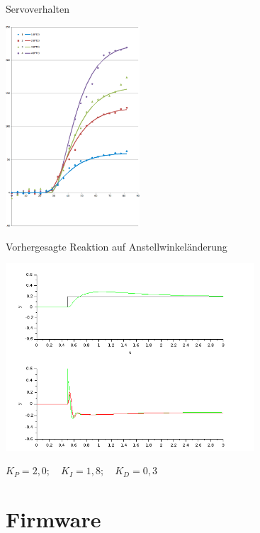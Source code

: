 \documentclass{beamer}
\begin{document}
\begin{frame}{Servoverhalten}
\begin{center}\includegraphics[height=75mm]{naeherung.png}\end{center}
\end{frame}

\begin{frame}{Vorhergesagte Reaktion auf Anstellwinkeländerung}
\begin{center}\includegraphics[height=70mm]{alpha_gamma.png}\end{center}
$K_P = 2,0;\quad K_I=1,8;\quad K_D = 0,3$
\end{frame}

\section{Firmware}
\end{document}
